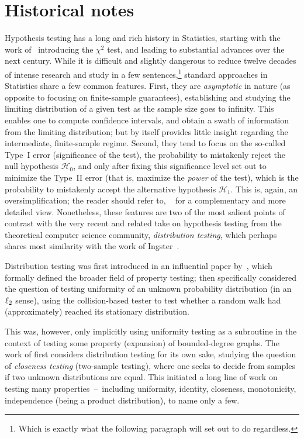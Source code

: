 \section{Historical notes}
Hypothesis testing has a long and rich history in Statistics, starting with the work of~\citet{Pearson1900} introducing the $\chi^2$ test, and leading to substantial advances over the next century. While it is difficult and slightly dangerous to reduce twelve decades of intense research and study in a few sentences,\footnote{Which is exactly what the following paragraph will set out to do regardless.} standard approaches in Statistics share a few common features. First, they are \emph{asymptotic} in nature (as opposite to focusing on finite-sample guarantees), establishing and studying the limiting distribution of a given test as the sample size goes to infinity. This enables one to compute confidence intervals, and obtain a swath of information from the limiting distribution; but by itself provides little insight regarding the intermediate, finite-sample regime. Second, they tend to focus on the so-called Type~I error (significance of the test), \ie the probability to mistakenly reject the null hypothesis $\mathcal{H}_0$, and only after fixing this significance level set out to minimize the Type~II error (that is, maximize the \emph{power} of the test), which is the probability to mistakenly accept the alternative hypothesis $\mathcal{H}_1$. This is, again, an oversimplification; the reader should refer to, \eg~\citet{BalakrishnanW18} for a complementary and more detailed view. Nonetheless, these features are two of the most salient points of contrast with the very recent and related take on hypothesis testing from the theoretical computer science community, \emph{distribution testing}, which perhaps shares most similarity with the work of Ingster~\citep{Ingster86,Ingster97}.

Distribution testing was first introduced in an influential paper by~\citet{GoldreichGR98}, which formally defined the broader field of property testing; \citet{GoldreichR00} then specifically considered the question of testing uniformity of an unknown probability distribution (in an~$\lp[2]$ sense), using the collision-based tester to test whether a random walk had (approximately) reached its stationary distribution.

This was, however, only implicitly using uniformity testing as a subroutine in the context of testing some property (expansion) of bounded-degree graphs. The work of \citet{BatuFRSW00} first considers distribution testing for its own sake, studying the question of \emph{closeness testing} (\ie two-sample testing), where one seeks to decide from samples if two unknown distributions are equal. This initiated a long line of work on testing many properties~--~including uniformity, identity, closeness, monotonicity, independence (being a product distribution), to name only a few.

